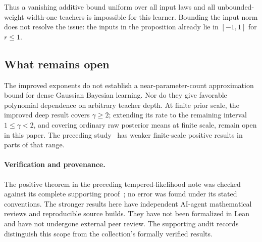 Thus a vanishing additive bound uniform over all input laws and all unbounded-weight width-one teachers is impossible for this learner. Bounding the input norm does not resolve the issue: the inputs in the proposition already lie in $[-1,1]$ for $r\le1$.

\subsection{What remains open}
The improved exponents do not establish a near-parameter-count approximation bound for dense Gaussian Bayesian learning. Nor do they give favorable polynomial dependence on arbitrary teacher depth. At finite prior scale, the improved deep result covers $\gamma\ge2$; extending its rate to the remaining interval $1\le\gamma<2$, and covering ordinary raw posterior means at finite scale, remain open in this paper. The preceding study~\cite{opus} has weaker finite-scale positive results in parts of that range.

\paragraph{Verification and provenance.}
The positive theorem in the preceding tempered-likelihood note was checked against its complete supporting proof~\cite{opus}; no error was found under its stated conventions. The stronger results here have independent AI-agent mathematical reviews and reproducible source builds. They have not been formalized in Lean and have not undergone external peer review. The supporting audit records distinguish this scope from the collection's formally verified results.
